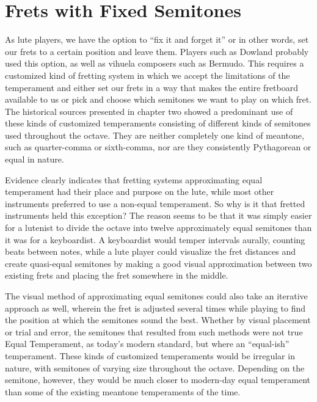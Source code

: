 \section{Frets with Fixed Semitones}

As lute players, we have the option to ``fix it and forget it'' or in other
words, set our frets to a certain position and leave them.  Players such as
Dowland probably used this option, as well as vihuela composers such as Bermudo.
This requires a customized kind of fretting system in which we accept the
limitations of the temperament and either set our frets in a way that makes the
entire fretboard available to us or pick and choose which semitones we want to
play on which fret. The historical sources presented in chapter two showed a
predominant use of these kinds of customized temperaments consisting of
different kinds of semitones used throughout the octave. They are neither
completely one kind of meantone, such as quarter-comma or sixth-comma, nor are
they consistently Pythagorean or equal in nature.

Evidence clearly indicates that fretting systems approximating equal temperament had
their place and purpose on the lute, while most other instruments preferred to use a
non-equal temperament.  So why is it that fretted instruments held this exception? The
reason seems to be that it was simply easier for a lutenist to divide the octave into
twelve approximately equal semitones than it was for a keyboardist. A keyboardist would
temper intervals aurally, counting beats between notes, while a lute player could
visualize the fret distances and create quasi-equal semitones by making a good
visual approximation between two existing frets and placing the fret somewhere in the
middle.

The visual method of approximating equal semitones could also take an iterative approach as well,
wherein the fret is adjusted several times while playing to find the position at which the semitones
sound the best. Whether by visual placement or trial and error, the semitones that resulted from
such methods were not true Equal Temperament, as today's modern standard, but where an ``equal-ish''
temperament. These kinds of customized temperaments would be irregular in nature, with semitones of
varying size throughout the octave.  Depending on the semitone, however, they would be much closer
to modern-day equal temperament than some of the existing meantone temperaments of the time.

